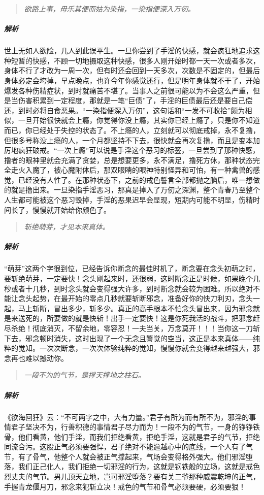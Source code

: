 \begin{quote}\it
    欲路上事，毋乐其便而姑为染指，一染指便深入万仞。
\end{quote}

\subparagraph{解析} 世上无如人欲险，几人到此误平生。一旦你尝到了手淫的快感，就会疯狂地追求这种短暂的快感，不顾一切地摄取这种快感，很多人刚开始时都一天一次或者多次，身体不行了才改为一周一次，但有时还会回到一天多次，次数是不固定的，但最后身体必定会垮掉，早点晚点，也许今年你感觉还行，但是明年身体就不干了，开始爆发各种伤精症状，到时就痛苦不堪了。当事人之前很可能以为不会这么严重，但是当伤害积累到一定程度，那就是一笔“巨债”了，手淫的巨债最后还是要自己偿还，到时必将自食恶果。“一染指便深入万仞”，这句话和“一发不可收拾”颇为相似，一旦开始很快就会上瘾，你觉得你没上瘾，其实你已经上瘾了，只是你不知道而已，你已经处于失控的状态了。不上瘾的人，立刻就可以彻底戒掉，永不复撸，但很多号称没上瘾的人，一个月都坚持不下去，很快就会再次复撸，而且是变本加厉地疯狂破戒。“一次上瘾”可以说是手淫这个恶习的标签，一旦尝到了那种快感，撸者的眼神里就会充满了贪婪，总是想要更多，永不满足，撸死方休，那种状态完全走火入魔了，被心魔附体后，那双眼睛的眼神特别怪异和可怕，有一种禽兽的感觉，已经没有人性了。在那种状态下，之前的戒色誓言全部都抛之脑后，唯一想做的就是撸出来。一旦染指手淫恶习，那真是掉入了万仞之深渊，整个青春乃至整个人生都可能被这个恶习毁掉，手淫的恶果迟早会显现，短期内可能不明显，伤精时间长了，慢慢就开始给你颜色了。

\begin{quote}\it
    斩绝萌芽，才见本来真体。
\end{quote}

\subparagraph{解析} “萌芽”这两个字很到位，已经告诉你断念的最佳时机了，断念要在念头初萌之时，要斩绝萌芽，一定要快！念头刚起来时，还很弱，这时断念正是时候，如果晚个几秒或者十几秒，到时念头就会变得强大许多，到时断念就会较为困难。所以绝对不能让念头起势，在最开始的零点几秒就要斩断邪念，准备好你的快刀利刃，念头一起，马上斩断，冒出多少，斩多少。真正的高手根本不怕念头冒出来，因为邪念就是来送死的，所要做的就是快斩！出手一定要快！这是你死我活的战斗，把邪念赶尽杀绝！彻底消灭，不留余地，零容忍！一夫当关，万念莫开！！！当你这一刀斩下去，邪念顿时消失，这时出现了一个无念且警觉的空当，这正是本来真体——纯粹的觉知。一次次断念，一次次体验纯粹的觉知，慢慢你就会变得越来越强大，邪念再也难以撼动你。

\begin{quote}\it
    一段不为的气节，是撑天撑地之柱石。
\end{quote}

\subparagraph{解析} 《欲海回狂》云：“不可两字之中，大有力量。”君子有所为而有所不为，邪淫的事情君子坚决不为，行善积德的事情君子尽力而为！一段不为的气节，一身的铮铮铁骨，他们看黄，他们手淫，而我们拒绝看黄，拒绝手淫，这就是君子的气节，拒绝同流合污。这股正气必须要强悍，君子绝对不能逾越心中的底线，一个人有了气节，有了骨气，他整个人就会被正气撑起来，气场会变得格外强大。他们邪淫堕落，我们正己化人，我们拒绝一切邪淫的行为，这就是钢铁般的立场，这就是戒色烈丈夫的气节。男儿顶天立地，岂可邪淫堕落？要有关二爷那种威震乾坤的正气，手握青龙偃月刀，邪念来犯斩立决！戒色的气节和骨气必须要硬，必须要狠！

